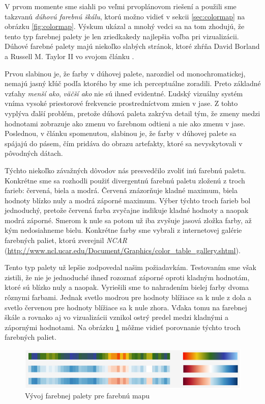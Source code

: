 V prvom momente sme siahli po veľmi prvoplánovom riešení a použili sme takzvanú \textit{dúhovú farebnú škálu}, ktorú možno vidieť v sekcii \ref{sec:colormap} na obrázku \ref{fig:colormap}. Výskum ukázal a mnohý vedci sa na tom zhodujú, že tento typ farebnej palety je len zriedkakedy najlepšia voľba pri vizualizácii. Dúhové farebné palety majú niekoľko slabých stránok, ktoré zhŕňa David Borland a Russell M. Taylor II vo svojom článku \cite{RainbowHarmful}.

Prvou slabinou je, že farby v dúhovej palete, narozdiel od monochromatickej, nemajú jasný kľúč podľa ktorého by sme ich perceptuálne zoradili. Preto základné vzťahy \textit{menší ako}, \textit{väčší ako} nie sú ihneď evidentné. Ľudský vizuálny systém vníma vysoké priestorové frekvencie prostredníctvom zmien v jase. Z tohto vyplýva ďalší problém, pretože dúhová paleta zakrýva detail tým, že zmeny medzi hodnotami zobrazuje ako zmenu vo farebnom odtieni a nie ako zmenu v jase. Poslednou, v článku spomenutou, slabinou je, že farby v dúhovej palete sa spájajú do pásem, čím pridáva do obrazu artefakty, ktoré sa nevyskytovali v pôvodných dátach. 

Týchto niekoľko závažných dôvodov nás presvedčilo zvoliť inú farebnú paletu. Konkrétne sme sa rozhodli použiť divergentnú farebnú paletu zloženú z troch farieb: červená, biela a modrá. Červená znázorňuje kladné maximum, biela hodnoty blízko nuly a modrá záporné maximum. Výber týchto troch farieb bol jednoduchý, pretože červená farba zvyčajne indikuje kladné hodnoty a naopak modrá záporné. Smerom k nule sa potom už iba zvyšuje jasová zložka farby, až kým nedosiahneme bielu. Konkrétne farby sme vybrali z internetovej galérie farebných paliet, ktorú zverejnil \textit{NCAR} (\url{http://www.ncl.ucar.edu/Document/Graphics/color_table_gallery.shtml}).

Tento typ palety už lepšie zodpovedal našim požiadavkám. Testovaním sme však zistili, že nie je jednoduché ihneď rozoznať záporné oproti kladným hodnotám, ktoré sú blízko nuly a naopak. Vyriešili sme to nahradením bielej farby dvoma rôznymi farbami. Jednak svetlo modrou pre hodnoty blížiace sa k nule z dola a svetlo červenou pre hodnoty blížiace sa k nule zhora. Vďaka tomu na farebnej škále a rovnako aj vo vizualizácii vznikol ostrý predel medzi kladnými a zápornými hodnotami. Na obrázku \ref{fig:colorpalettes} môžme vidieť porovnanie týchto troch farebných paliet.


\begin{figure}
	\centering
	\includegraphics[width = 5in]{colorpalettes}
	\caption{Vývoj farebnej palety pre farebnú mapu}
	\label{fig:colorpalettes}
\end{figure}


